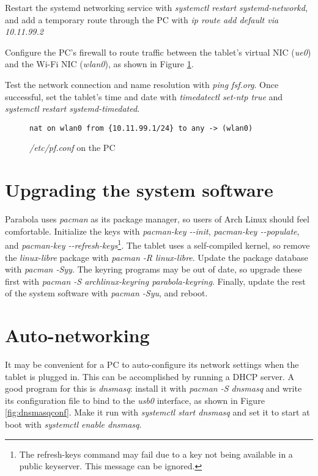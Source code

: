 \documentclass{memoir}
\begin{document}
Restart the systemd networking service with \textit{systemctl restart systemd-networkd}, and add a temporary route through the PC with \textit{ip route add default via 10.11.99.2}

Configure the PC's firewall to route traffic between the tablet's virtual NIC (\textit{ue0}) and the Wi-Fi NIC (\textit{wlan0}), as shown in Figure \ref{fig:pfconf}.

Test the network connection and name resolution with \textit{ping fsf.org}. Once successful, set the tablet's time and date with \textit{timedatectl set-ntp true} and \textit{systemctl restart systemd-timedated}.

\begin{figure}[h]
\begin{verbatim}
nat on wlan0 from {10.11.99.1/24} to any -> (wlan0)
\end{verbatim}
\caption{\textit{/etc/pf.conf} on the PC}
\label{fig:pfconf}
\end{figure}

\pagebreak
\section{Upgrading the system software}
Parabola uses \textit{pacman} as its package manager, so users of Arch Linux should feel comfortable. Initialize the keys with \textit{pacman-key -\phantom{}-init}, \textit{pacman-key -\phantom{}-populate}, and \textit{pacman-key -\phantom{}-refresh-keys}\footnote{The refresh-keys command may fail due to a key not being available in a public keyserver. This message can be ignored.}. The tablet uses a self-compiled kernel, so remove the \textit{linux-libre} package with \textit{pacman -R linux-libre}. Update the package database with \textit{pacman -Syy}. The keyring programs may be out of date, so upgrade these first with \textit{pacman -S archlinux-keyring parabola-keyring}. Finally, update the rest of the system software with \textit{pacman -Syu}, and reboot.


\section{Auto-networking}
It may be convenient for a PC to auto-configure its network settings when the tablet is plugged in. This can be accomplished by running a DHCP server. A good program for this is \textit{dnsmasq}: install it with \textit{pacman -S dnsmasq} and write its configuration file to bind to the \textit{usb0} interface, as shown in Figure \ref{fig:dnsmasqconf}. Make it run with \textit{systemctl start dnsmasq} and set it to start at boot with \textit{systemctl enable dnsmasq}.
\end{document}
